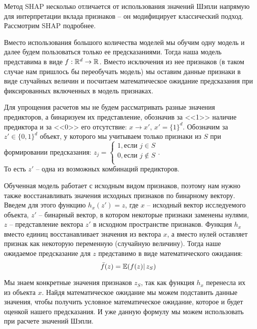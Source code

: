 Метод SHAP несколько отличается от использования значений Шэпли напрямую для интерпретации вклада признаков -- он модифицирует классический подход. Рассмотрим SHAP подробнее.

Вместо использования большого количества моделей мы обучим одну модель и далее будем пользоваться только ее предсказаниями. Тогда наша модель представима в виде $f: \mathbb{R}^d \rightarrow \mathbb{R}$. Вместо исключения из нее признаков (в таком случае нам пришлось бы переобучать модель) мы оставим данные признаки в виде случайных величин и посчитаем математическое ожидание предсказания при фиксированных включенных в модель признаках.

Для упрощения расчетов мы не будем рассматривать разные значения предикторов, а бинаризуем их представление, обозначив за <<1>> наличие предиктора и за <<0>> его отсутствие: $x \rightarrow x', \, x' = \{1\}^d$. %
Обозначим за $z' \in \{0,1\}^d$ объект, у которого мы учитываем только признаки из $S$ при формировании предсказания:
$z_j =
\begin{cases}
1, \text{если $j \in S$}\\
0, \text{если $j \notin S$}\\
\end{cases}$.\\
То есть $z'$ -- одна из возможных комбинаций предикторов.

Обученная модель работает с исходным видом признаков, поэтому нам нужно также восстанавливать значения исходных признаков по бинарному вектору. Введем для этого функцию $h_x(z') = z$, где $x$ -- исходный вектор исследуемого объекта, $z'$ -- бинарный вектор, в котором некоторые признаки заменены нулями, $z$ -- представление вектора $z'$ в исходном пространстве признаков. Функция $h_x$ вместо единиц восстанавливает значения из вектора $x$, а вместо нулей оставляет признак как некоторую переменную (случайную величину).
Тогда наше ожидаемое предсказание для $z$ представимо в виде математического ожидания:
\[
\bar{f}(z) = \mathbb{E}(f(z)|\,z_S)
\]

Мы знаем конкретные значения признаков $z_S$, так как функция $h_x$ перенесла их из объекта $x$. Найдя математическое ожидание мы можем подставить данные значения, чтобы получить условное математическое ожидание, которое и будет оценкой нашего предсказания. И уже данную формулу мы можем использовать при расчете значений Шэпли.%

